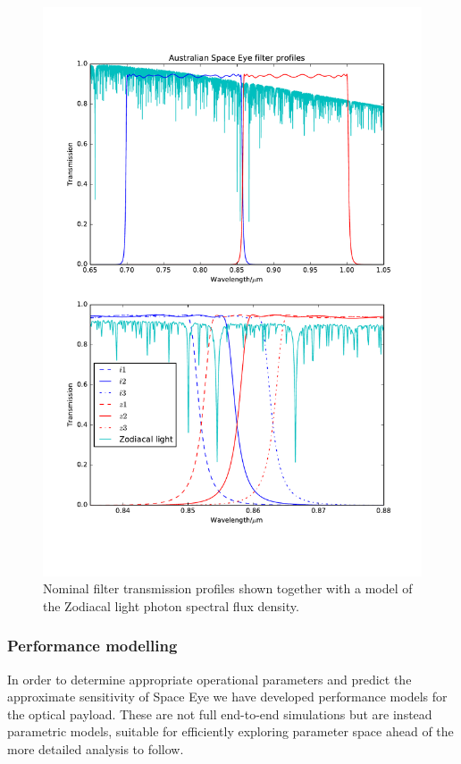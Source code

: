 \documentclass[]{iac}
\begin{document}
\begin{figure}[pt]
  \center \includegraphics[width=\columnwidth]{figures/filters.pdf}
  \caption{\label{fig:filters}Nominal filter transmission profiles shown together with a model of the Zodiacal light
    photon spectral flux density.}
\end{figure}

\subsubsection{Performance modelling} \label{sec:perf}

In order to determine appropriate operational parameters and predict the approximate sensitivity of Space Eye we have
developed performance models for the optical payload. These are not full end-to-end simulations but are instead
parametric models, suitable for efficiently exploring parameter space ahead of the more detailed analysis to follow.
\end{document}
